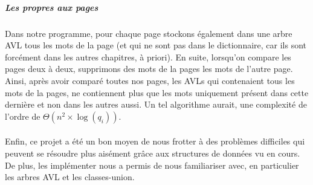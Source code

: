 \documentclass[a4paper]{article}
\begin{document}
			\subparagraph{Les propres aux pages}{
			Dans notre programme, pour chaque page stockons également dans une arbre AVL tous
			les mots de la page (et qui ne sont pas dans le dictionnaire, car ils sont forcément
			dans les autres chapitres, à priori). En suite, lorsqu'on compare les pages deux à 
			deux, supprimons des mots de la pages les mots de l'autre page. Ainsi, après avoir 
			comparé toutes nos pages, les AVLs qui contenaient tous les mots de la pages, ne
			contiennent plus que les mots uniquement présent dans cette dernière et non dans les
			autres aussi. Un tel algorithme aurait, une complexité de l'ordre de 
			$\Theta(n^2 \times \log(q_i))$.
			}
		
		\paragraph{}{
		Enfin, ce projet a été un bon moyen de nous frotter à des problèmes difficiles qui peuvent
		se résoudre plus aisément grâce aux structures de données vu en cours. De plus, les 
		implémenter nous a permis de nous familiariser avec, en particulier les arbres AVL et
		les classes-union.
		}
		
\end{document}
